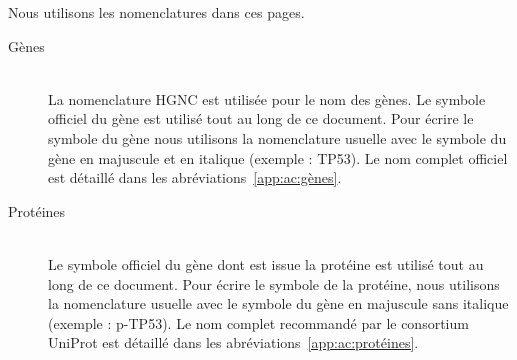 	{\noindent}Nous utilisons les nomenclatures dans ces pages.
	\begin{description}
		\item[Gènes]		\hfill \\
			La nomenclature \acs{HGNC} est utilisée pour le nom des gènes. Le symbole officiel du gène est utilisé tout au long de ce document. Pour écrire le symbole du gène nous utilisons la nomenclature usuelle avec le symbole du gène en majuscule et en italique (exemple : \acs{TP53}). Le nom complet officiel est détaillé dans les abréviations~\ref{app:ac:gènes}.
		\item[Protéines]	\hfill \\
			Le symbole officiel du gène dont est issue la protéine est utilisé tout au long de ce document. Pour écrire le symbole de la protéine, nous utilisons la nomenclature usuelle avec le symbole du gène en majuscule sans italique (exemple : \acs{p-TP53}). Le nom complet recommandé par le consortium UniProt est détaillé dans les abréviations~\ref{app:ac:protéines}.
	\end{description}